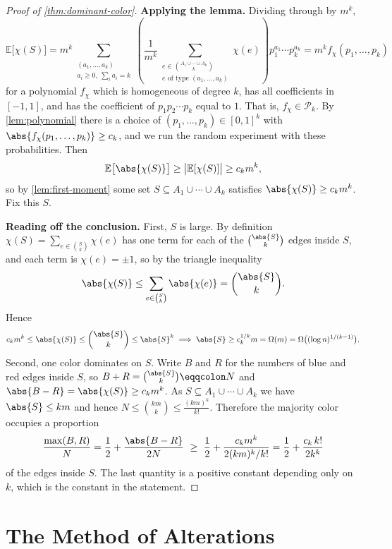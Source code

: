 \begin{proof}[Proof of \autoref{thm:dominant-color}]
    \textbf{Applying the lemma.} Dividing through by \(m^k\),
    \[
        \mathbb{E}\bigl[ \chi(S) \bigr]
        = m^k \sum_{\substack{(a_1, \ldots, a_k) \\ a_i \ge 0, \ \sum_i a_i = k}}
          \left( \frac{1}{m^k} \sum_{\substack{e \in \binom{A_1 \cup \cdots \cup A_k}{k} \\ e \text{ of type } (a_1, \ldots, a_k)}} \chi(e) \right) p_1^{a_1} \cdots p_k^{a_k}
        = m^k f_\chi(p_1, \ldots, p_k)
    \]
    for a polynomial \(f_\chi\) which is homogeneous of degree \(k\), has all coefficients in \([-1,1]\), and has the coefficient of \(p_1 p_2 \cdots p_k\) equal to \(1\). That is, \(f_\chi \in \mathcal{P}_k\). By \autoref{lem:polynomial} there is a choice of \((p_1, \ldots, p_k) \in [0,1]^k\) with \(\abs{f_\chi(p_1, \ldots, p_k)} \ge c_k\), and we run the random experiment with these probabilities. Then
    \[
        \mathbb{E}\bigl[ \abs{\chi(S)} \bigr] \ge \bigl| \mathbb{E}[\chi(S)] \bigr| \ge c_k m^k,
    \]
    so by \autoref{lem:first-moment} some set \(S \subseteq A_1 \cup \cdots \cup A_k\) satisfies \(\abs{\chi(S)} \ge c_k m^k\). Fix this \(S\).

    \textbf{Reading off the conclusion.} First, \(S\) is large. By definition \(\chi(S) = \sum_{e \in \binom{S}{k}} \chi(e)\) has one term for each of the \(\binom{\abs{S}}{k}\) edges inside \(S\), and each term is \(\chi(e) = \pm 1\), so by the triangle inequality
    \[
        \abs{\chi(S)} \le \sum_{e \in \binom{S}{k}} \abs{\chi(e)} = \binom{\abs{S}}{k}.
    \]
    Hence
    \[
        c_k m^k \le \abs{\chi(S)} \le \binom{\abs{S}}{k} \le \abs{S}^k
        \implies \abs{S} \ge c_k^{1/k} m = \Omega(m) = \Omega\bigl( (\log n)^{1/(k-1)} \bigr).
    \]
    Second, one color dominates on \(S\). Write \(B\) and \(R\) for the numbers of blue and red edges inside \(S\), so \(B + R = \binom{\abs{S}}{k} \eqqcolon N\) and \(\abs{B - R} = \abs{\chi(S)} \ge c_k m^k\). As \(S \subseteq A_1 \cup \cdots \cup A_k\) we have \(\abs{S} \le km\) and hence \(N \le \binom{km}{k} \le \frac{(km)^k}{k!}\). Therefore the majority color occupies a proportion
    \[
        \frac{\max(B,R)}{N} = \frac{1}{2} + \frac{\abs{B-R}}{2N}
        \ \ge\ \frac{1}{2} + \frac{c_k m^k}{2 (km)^k / k!}
        = \frac{1}{2} + \frac{c_k \, k!}{2 k^k}
    \]
    of the edges inside \(S\). The last quantity is a positive constant depending only on \(k\), which is the constant in the statement.
\end{proof}

\chapter{The Method of Alterations}

